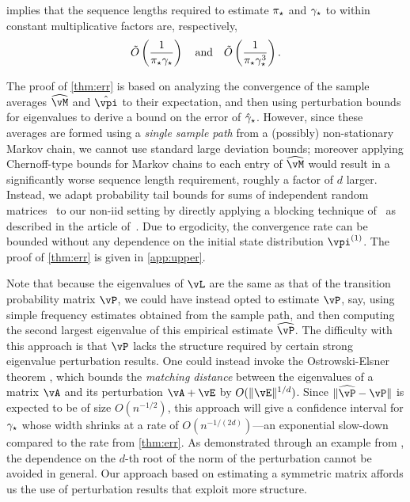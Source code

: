  implies that the sequence lengths required to estimate
$\pi_{\star}$ and
$\gamma_{\star}$ to within constant multiplicative factors are, respectively,
\[
  \tilde{O}\left(\frac1{\pi_{\star}\gamma_{\star}}\right)
  \quad\text{and}\quad
  \tilde{O}\left(\frac1{\pi_{\star}\gamma_{\star}^3}\right)
  .
\]

The proof of \cref{thm:err} is based on analyzing the
convergence of the sample averages $\wh{\vM}$ and
$\hat\vpi$ to their expectation, and then using perturbation bounds
for eigenvalues to derive a bound on the error of $\hat\gamma_{\star}$.
However, since these averages are formed using a \emph{single sample
path} from a (possibly) non-stationary Markov chain, we cannot use
standard large deviation bounds; moreover applying Chernoff-type
bounds for Markov chains to each entry of $\wh{\vM}$ would result in a
significantly worse sequence length requirement, roughly a factor of
$d$ larger.
Instead, we adapt probability tail bounds for sums of independent
random matrices~\citep{tropp2015intro} to our non-iid setting by
directly applying a blocking technique of~\citet{Bernstein27} as
described in the article of~\citet{Yu94}.
Due to ergodicity, the convergence rate can be bounded without any
dependence on the initial state distribution $\vpi^{(1)}$.
The proof of \cref{thm:err} is given in \cref{app:upper}.

Note that because the eigenvalues of $\vL$ are the same as that of the
transition probability matrix $\vP$, 
we could have instead opted to
estimate $\vP$, say, using simple frequency estimates obtained from
the sample path, and then computing the second largest eigenvalue of
this empirical estimate $\wh\vP$.
The difficulty with this approach is that $\vP$ lacks the structure
required by certain strong eigenvalue perturbation results.
One could instead invoke the Ostrowski-Elsner theorem
\citep[cf.~Theorem 1.4 on Page 170 of][]{stewart1990matrix}, which
bounds the \emph{matching distance} between the eigenvalues of a
matrix $\vA$ and its perturbation $\vA+\vE$ by $O(\norm{\vE}^{1/d})$.
Since $\norm{\wh\vP-\vP}$ is expected to be of size $O(n^{-1/2})$,
this approach will give a confidence interval for $\gamma_{\star}$ whose width
shrinks at a rate of $O(n^{-1/(2d)})$---an exponential slow-down
compared to the rate from \cref{thm:err}.
As demonstrated through an example from \citet{stewart1990matrix}, the
dependence on the $d$-th root of the norm of the perturbation cannot
be avoided in general.
Our approach based on estimating a symmetric matrix affords us the use
of perturbation results that exploit more structure.

